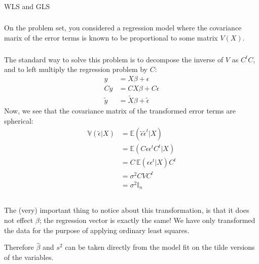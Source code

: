 \begin{frame}[fragile] \frametitle{}

\begin{flushright}
{\color{yaleblue}\sc\fontsize{1cm}{0cm}\selectfont WLS and GLS}
\end{flushright}

\end{frame}

\begin{frame}[fragile] \frametitle{}

On the problem set, you considered a regression model where the
covariance marix of the error terms is known to be proportional
to some matrix $V(X)$.

\end{frame}

\begin{frame}[fragile] \frametitle{}

The standard way to solve this
problem is to decompose the inverse of $V$ as $C^t C$, and to
left multiply the regression problem by $C$:
\begin{align*}
y &= X \beta + \epsilon \\
Cy &= C X \beta + C\epsilon \\
\tilde{y} &= \tilde{X} \beta + \tilde{\epsilon}
\end{align*}
\pause Now, we see that the covariance matrix of the transformed error
terms are spherical:
\begin{align*}
\mathbb{V} (\tilde{\epsilon} | X) &= \mathbb{E} (\tilde{\epsilon} \tilde{\epsilon}^t | X) \\
&= \mathbb{E} ( C \epsilon \epsilon^t C^t | X) \\
&= C \, \mathbb{E} ( \epsilon \epsilon^t | X) C^t \\
&= \sigma^2 C V C^t \\
&= \sigma^2 \mathbb{I}_n \\
\end{align*}

\end{frame}

\begin{frame}[fragile] \frametitle{}

The (very) important thing to notice about this transformation, is
that it does not effect $\beta$; the regression vector is exactly
the same! \pause We have only transformed the data for the purpose
of applying ordinary least squares.

\pause Therefore $\widehat{\beta}$ and $s^2$ can be taken directly
from the model fit on the tilde versions of the variables.

\end{frame}

